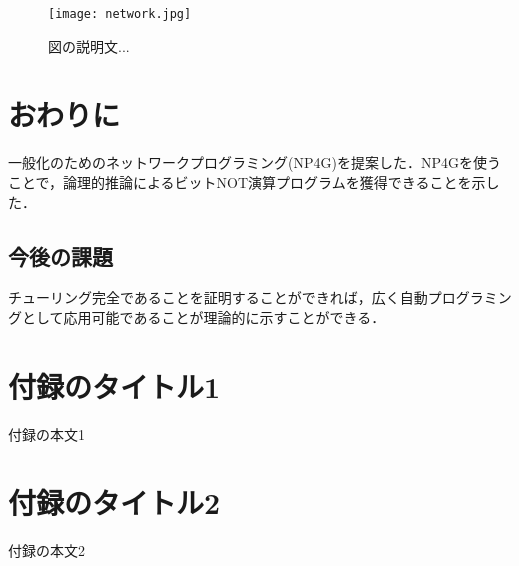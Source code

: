 \documentclass[exploratorypaper]{jsaiart} %
\begin{document}
\begin{figure*}[t]
    \begin{center}
        \texttt{[image: network.jpg]}
    \end{center}
    \capwidth=90mm %
    \caption{図の説明文... }
\end{figure*}

\section{おわりに}
一般化のためのネットワークプログラミング(NP4G)を提案した．NP4Gを使うことで，論理的推論によるビットNOT演算プログラムを獲得できることを示した．

\subsection{今後の課題}
チューリング完全であることを証明することができれば，広く自動プログラミングとして応用可能であることが理論的に示すことができる．




\appendix

\section{付録のタイトル1}

付録の本文1

\section{付録のタイトル2}

付録の本文2

\begin{biography}
\end{biography}
\end{document}
